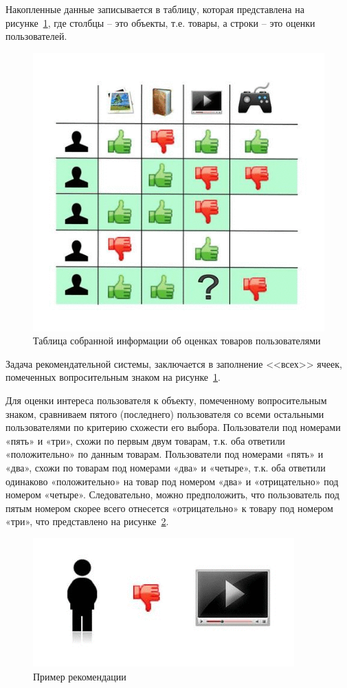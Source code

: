 \documentclass[a4paper,14pt,openany,final]{extreport} %
\begin{document}
Накопленные данные записывается в таблицу, которая представлена на рисунке~\ref{fig:collab2}, где столбцы -- это объекты, т.е. товары, а строки -- это оценки пользователей.
\begin{figure}[htb]
  \centering
  \includegraphics[width=0.5\linewidth]{collab2.png}
  \caption{Таблица собранной информации об оценках товаров пользователями}
  \label{fig:collab2}
\end{figure}

Задача рекомендательной системы, заключается в заполнение <<всех>> ячеек, помеченных вопросительным знаком на рисунке~\ref{fig:collab2}.

Для оценки интереса пользователя к объекту, помеченному вопросительным знаком, сравниваем пятого (последнего) пользователя со всеми остальными пользователями по критерию схожести его выбора. Пользователи под номерами «пять» и «три», схожи по первым двум товарам, т.к. оба ответили «положительно» по данным товарам. Пользователи под номерами «пять» и «два», схожи по товарам под номерами «два» и «четыре», т.к. оба ответили одинаково «положительно» на товар под номером «два» и «отрицательно» под номером «четыре». Следовательно, можно предположить, что пользователь под пятым номером скорее всего отнесется «отрицательно» к товару под номером «три», что представлено на рисунке~\ref{fig:collab3}.

\begin{figure}[htb]
  \centering
  \includegraphics[width=0.5\linewidth]{collab3.png}
  \caption{Пример рекомендации}
  \label{fig:collab3}
\end{figure}
\end{document}
